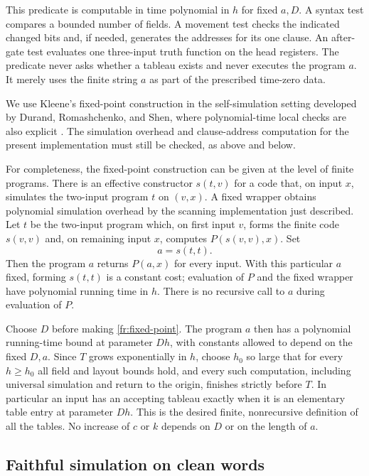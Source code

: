 This predicate is computable in time polynomial in $h$ for fixed
$a,D$.  A syntax test compares a bounded number of fields.  A
movement test checks the indicated changed bits and, if needed,
generates the addresses for its one clause.  An after-gate test
evaluates one three-input truth function on the head registers.
The predicate never asks whether a tableau exists and never
executes the program $a$.  It merely uses the finite string $a$ as
part of the prescribed time-zero data.

We use Kleene's fixed-point construction in the self-simulation
setting developed by Durand, Romashchenko, and Shen, where
polynomial-time local checks are also explicit
\cite[Section~2.3]{DurandRomashchenkoShen2012}. The simulation overhead
and clause-address computation for the present implementation must
still be checked, as above and below.

For completeness, the fixed-point construction can be given at
the level of finite programs.  There is an effective constructor
$s(t,v)$ for a code that, on input $x$, simulates the two-input
program $t$ on $(v,x)$.  A fixed wrapper obtains polynomial
simulation overhead by the scanning implementation just described.
Let $t$ be the two-input program which, on first input $v$, forms
the finite code $s(v,v)$ and, on remaining input $x$, computes
$P(s(v,v),x)$.  Set
\begin{equation}\label{fr:fixed-point}
 a=s(t,t).
\end{equation}
Then the program $a$ returns $P(a,x)$ for every input.  With this
particular $a$ fixed, forming $s(t,t)$ is a constant cost; evaluation
of $P$ and the fixed wrapper have polynomial running time in $h$.
There is no recursive call to $a$ during evaluation of $P$.

Choose $D$ before making \eqref{fr:fixed-point}.  The program $a$
then has a polynomial running-time bound at parameter $Dh$, with
constants allowed to depend on the fixed $D,a$.  Since $T$ grows
exponentially in $h$, choose $h_0$ so large that for every $h\geq h_0$
all field and layout bounds hold, and every such computation,
including universal simulation and return to the origin, finishes
strictly before $T$.  In particular an input has an accepting
tableau exactly when it is an elementary table entry at parameter
$Dh$.  This is the desired finite, nonrecursive definition of all
the tables.  No increase of $c$ or $k$ depends on $D$ or on the
length of $a$.

\subsection{Faithful simulation on clean words}\label{fr:simulation}

